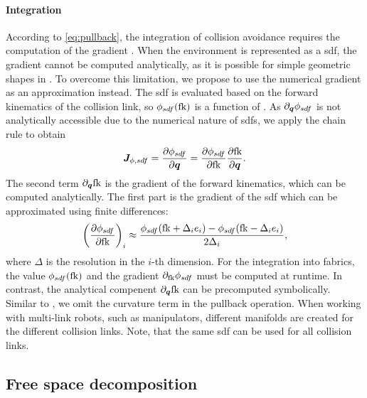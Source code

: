 \paragraph{Integration}
According 
to \cref{eq:pullback}, the integration of collision
avoidance requires the computation of the gradient \J{}.
When the environment is represented as a \ac{sdf}, the gradient cannot be
computed analytically, as it is possible for simple geometric shapes in
\cite{Ratliff2021,Spahn2023}. To overcome this limitation, we propose to
use the numerical gradient as an approximation instead.
The \ac{sdf} is evaluated based on the forward kinematics of the collision link,
so $\phi_{sdf}(\textrm{fk})$ is a function of \q{}.
As $\partial_{\bm{q}}\phi_{sdf}$ is not analytically accessible due to the numerical
nature of \acp{sdf}, we apply the chain rule to obtain
\[
  \bm{J}_{\phi,sdf} = \frac{\partial\phi_{sdf}}{\partial\bm{q}} = \frac{\partial\phi_{sdf}}{\partial\textrm{fk}}\frac{\partial\textrm{fk}}{\partial\bm{q}}.
\]
The second term $\partial_{\bm{q}}\textrm{fk}$ is the gradient of the forward
kinematics, which can be computed analytically. The first part is the gradient
of the \ac{sdf} which can be
approximated using finite differences:
\[
  \left(\frac{\partial\phi_{sdf}}{\partial\textrm{fk}}\right)_i \approx 
  \frac{\phi_{sdf}(\textrm{fk} + \Delta_i e_i) - \phi_{sdf}(\textrm{fk} - \Delta_i e_i)}{2 \Delta_i},
\]
where $\Delta$ is the resolution in the $i$-th dimension.
For the integration into \ac{fabrics}, the
value $\phi_{sdf}(\textrm{fk})$ and the gradient $\partial_{\textrm{fk}}\phi_{sdf}$
must be computed at runtime.
In contrast, the analytical compenent $\partial_{\bm{q}}\textrm{fk}$ can be
precomputed symbolically. Similar to \cite{Ratliff2021}, we omit the
curvature term \Jdot{} in the pullback operation.
%
When working with multi-link robots, such as manipulators, different manifolds
are created for the different collision links. Note, that
the same \ac{sdf}
can be used for all collision links.

\subsection{Free space decomposition}
\label{sub:Free Space Decomposition}

